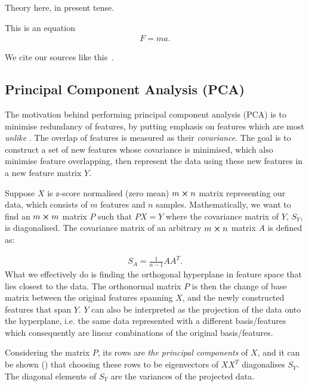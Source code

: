 Theory here, in present tense.

This is an equation
\begin{align} \label{theo:eq:newton2}
    F = ma.
\end{align}

We cite our sources like this~\citep{Project1}.

\subsection{Principal Component Analysis (PCA)}
    The motivation behind performing principal component analysis (PCA) is to minimise redundancy of features, by putting emphasis on features which are most \textit{unlike} . The overlap of features is measured as their \textit{covariance}. The goal is to construct a set of new features whose covariance is minimised, which also minimise feature overlapping, then represent the data using these new features in a new feature matrix $Y$. 
    

    Suppose $X$ is z-score normalised (zero mean) $m\cross n$ matrix representing our data, which consists of $m$ features and $n$ samples. Mathematically, we want to find an $m\cross m$ matrix $P$ such that $PX=Y$ where the covariance matrix of $Y$, $S_Y$, is diagonalised. The covariance matrix of an arbitrary $m\cross n$ matrix $A$ is defined as:

    \begin{align} \label{theo:eq:covariance_definition}
        S_A = \frac{1}{n-1}AA^T.
    \end{align}
    What we effectively do is finding the orthogonal hyperplane in feature space that lies closest to the data. The orthonormal matrix $P$ is then the change of base matrix between the original features spanning $X$, and the newly constructed features that span $Y$. $Y$ can also be interpreted as the projection of the data onto the hyperplane, i.e. the same data represented with a different basis/features which consequently are linear combinations of the original basis/features. 

    Considering the matrix $P$, its rows are \textit{the principal components} of $X$, and it can be shown () that choosing these rows to be eigenvectors of $XX^T$ diagonalises $S_Y$.  The diagonal elements of $S_Y$ are the variances of the projected data. 

